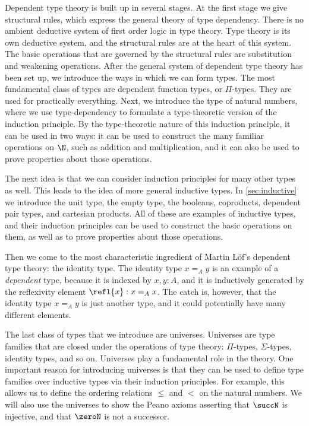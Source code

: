 Dependent type theory is built up in several stages. At the first stage we give structural rules, which express the general theory of type dependency. There is no ambient deductive system of first order logic in type theory. Type theory is its own deductive system, and the structural rules are at the heart of this system. The basic operations that are governed by the structural rules are substitution and weakening operations. After the general system of dependent type theory has been set up, we introduce the ways in which we can form types. The most fundamental class of types are dependent function types, or $\Pi$-types. They are used for practically everything. Next, we introduce the type of natural numbers, where we use type-dependency to formulate a type-theoretic version of the induction principle. By the type-theoretic nature of this induction principle, it can be used in two ways: it can be used to construct the many familiar operations on $\N$, such as addition and multiplication, and it can also be used to prove properties about those operations.

The next idea is that we can consider induction principles for many other types as well. This leads to the idea of more general inductive types. In \cref{sec:inductive} we introduce the unit type, the empty type, the booleans, coproducts, dependent pair types, and cartesian products. All of these are examples of inductive types, and their induction principles can be used to construct the basic operations on them, as well as to prove properties about those operations.

Then we come to the most characteristic ingredient of Martin L\"of's dependent type theory: the identity type. The identity type $x=_Ay$ is an example of a \emph{dependent} type, because it is indexed by $x,y:A$, and it is inductively generated by the reflexivity element $\refl{x}:x=_Ax$. The catch is, however, that the identity type $x=_Ay$ is just another type, and it could potentially have many different elements.

The last class of types that we introduce are universes. Universes are type families that are closed under the operations of type theory: $\Pi$-types, $\Sigma$-types, identity types, and so on. Universes play a fundamental role in the theory. One important reason for introducing universes is that they can be used to define type families over inductive types via their induction principles. For example, this allows us to define the ordering relations $\leq$ and $<$ on the natural numbers. We will also use the universes to show the Peano axioms asserting that $\succN$ is injective, and that $\zeroN$ is not a successor.

